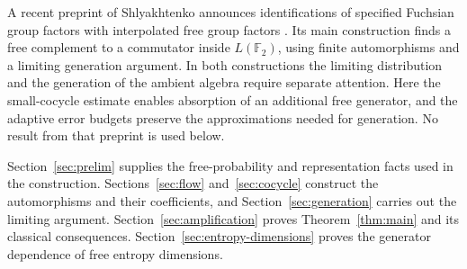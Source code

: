 \documentclass[11pt]{article}
\numberwithin{equation}{section}
\theoremstyle{definition}
\theoremstyle{remark}
\newcommand{\F}{\mathbb F}
\begin{document}
A recent preprint of Shlyakhtenko announces identifications of specified Fuchsian group factors with interpolated free group factors \cite{shlyakhtenko2026fuchsian}. Its main construction finds a free complement to a commutator inside $L(\F_2)$, using finite automorphisms and a limiting generation argument. In both constructions the limiting distribution and the generation of the ambient algebra require separate attention. Here the small-cocycle estimate enables absorption of an additional free generator, and the adaptive error budgets preserve the approximations needed for generation. No result from that preprint is used below.

Section~\ref{sec:prelim} supplies the free-probability and representation facts used in the construction. Sections~\ref{sec:flow} and~\ref{sec:cocycle} construct the automorphisms and their coefficients, and Section~\ref{sec:generation} carries out the limiting argument. Section~\ref{sec:amplification} proves Theorem~\ref{thm:main} and its classical consequences. Section~\ref{sec:entropy-dimensions} proves the generator dependence of free entropy dimensions.










\end{document}
